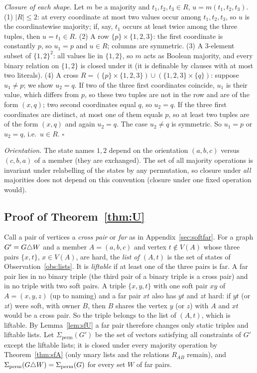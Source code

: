 \emph{Closure of each shape.} Let $m$ be a majority and $t_1,t_2,t_3\in R$, $u=m(t_1,t_2,t_3)$.
(1) $|R|\le2$: at every coordinate at most two values occur among $t_1,t_2,t_3$, so $u$ is the coordinatewise majority; if, say, $t_1$ occurs at least twice among the three tuples, then $u=t_1\in R$.
(2) A row $\{p\}\times\{1,2,3\}$: the first coordinate is constantly $p$, so $u_1=p$ and $u\in R$; columns are symmetric.
(3) A $3$-element subset of $\{1,2\}^2$: all values lie in $\{1,2\}$, so $m$ acts as Boolean majority, and every binary relation on $\{1,2\}$ is closed under it (it is definable by clauses with at most two literals).
(4) A cross $R=(\{p\}\times\{1,2,3\})\cup(\{1,2,3\}\times\{q\})$: suppose $u_1\ne p$; we show $u_2=q$. If two of the three first coordinates coincide, $u_1$ is their value, which differs from $p$, so these two tuples are not in the row and are of the form $(x,q)$; two second coordinates equal $q$, so $u_2=q$. If the three first coordinates are distinct, at most one of them equals $p$, so at least two tuples are of the form $(x,q)$ and again $u_2=q$. The case $u_2\ne q$ is symmetric. So $u_1=p$ or $u_2=q$, i.e.\ $u\in R$. \hfill$\square$

\emph{Orientation.} The state names $1,2$ depend on the orientation $(a,b,c)$ versus $(c,b,a)$ of a member (they are exchanged). The set of all majority operations is invariant under relabelling of the states by any permutation, so closure under \emph{all} majorities does not depend on this convention (closure under one fixed operation would).

\subsection{Proof of Theorem~\ref{thm:U}}\label{app:softU}
Call a pair of vertices a \emph{cross pair} or \emph{far} as in Appendix~\ref{sec:softfar}. For a graph $G'=G\triangle W$ and a member $A=(a,b,c)$ and vertex $t\notin V(A)$ whose three pairs $\{x,t\}$, $x\in V(A)$, are hard, the \emph{list of $(A,t)$} is the set of states of Observation~\ref{obs:lists}. It is \emph{liftable} if at least one of the three pairs is far. A far pair lies in no binary triple (the third pair of a binary triple is a cross pair) and in no triple with two soft pairs. A triple $\{x,y,t\}$ with one soft pair $xy$ of $A=(x,y,z)$ (up to naming) and a far pair $xt$ also has $yt$ and $zt$ hard: if $yt$ (or $zt$) were soft, with owner $B$, then $B$ shares the vertex $y$ (or $z$) with $A$ and $xt$ would be a cross pair. So the triple belongs to the list of $(A,t)$, which is liftable. By Lemma~\ref{lem:sfU} a far pair therefore changes only static triples and liftable lists. Let $\Sigma_{\mathrm{perm}}(G')$ be the set of vectors satisfying all constraints of $G'$ except the liftable lists; it is closed under every majority operation by Theorem~\ref{thm:sfA} (only unary lists and the relations $R_{AB}$ remain), and $\Sigma_{\mathrm{perm}}(G\triangle W)=\Sigma_{\mathrm{perm}}(G)$ for every set $W$ of far pairs.


